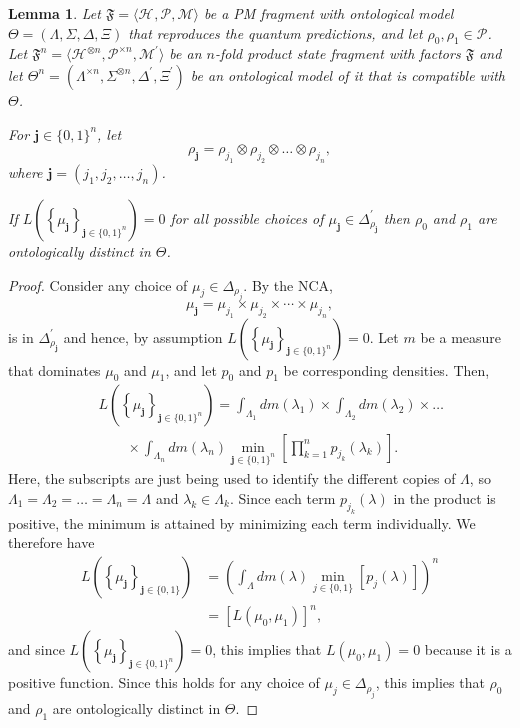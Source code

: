 \documentclass[DIV=calc,fontsize=12pt]{scrartcl} %
\theoremstyle{definition}
\theoremstyle{plain}
\newtheorem{lemma}[definition]{Lemma}
\newcommand{\Hilb}[1][]{\ensuremath{\mathcal{H}_{#1}}}
\begin{document}
\begin{lemma}
\label{lem:Main:prod}
Let $\mathfrak{F} = \langle \Hilb, \mathcal{P}, \mathcal{M} \rangle$
be a PM fragment with ontological model $\Theta = (\Lambda, \Sigma,
\Delta, \Xi)$ that reproduces the quantum predictions, and let
$\rho_0, \rho_1 \in \mathcal{P}$.  Let $\mathfrak{F}^n = \langle
\Hilb^{\otimes n}, \mathcal{P}^{\times n}, \mathcal{M}^{\prime}
\rangle$ be an $n$-fold product state fragment with factors
$\mathfrak{F}$ and let $\Theta^n = (\Lambda^{\times n},
\Sigma^{\otimes n}, \Delta^{\prime}, \Xi^{\prime})$ be an
ontological model of it that is compatible with $\Theta$.

For $\bm{j} \in \{0,1\}^n$, let
\begin{equation}
\rho_{\bm{j}} = \rho_{j_1} \otimes \rho_{j_2} \otimes \ldots
\otimes \rho_{j_n},
\end{equation}
where $\bm{j} = (j_1,j_2,\ldots,j_n)$.

If $L \left ( \left \{ \mu_{\bm{j}}\right \}_{\bm{j} \in \{0,1\}^n}
\right ) = 0$ for all possible choices of $\mu_{\bm{j}} \in
\Delta^{\prime}_{\rho_{\bm{j}}}$ then $\rho_0$ and $\rho_1$ are
ontologically distinct in $\Theta$.
\end{lemma}
\begin{proof}
Consider any choice of $\mu_j \in \Delta_{\rho_j}$.  By the NCA,
\begin{equation}
\mu_{\bm{j}} = \mu_{j_1} \times \mu_{j_2} \times \cdots \times \mu_{j_n},
\end{equation}
is in $\Delta^{\prime}_{\rho_{\bm{j}}}$ and hence, by assumption $L
\left ( \left \{ \mu_{\bm{j}}\right \}_{\bm{j} \in \{0,1\}^n}\right
) = 0$.  Let $m$ be a measure that dominates $\mu_0$ and $\mu_1$,
and let $p_0$ and $p_1$ be corresponding densities. Then,
\begin{eqnarray}
&&L \left ( \left \{ \mu_{\bm{j}}\right \}_{\bm{j} \in \{0,1\}^n}\right ) =
\int_{\Lambda_1} dm(\lambda_1) \times \int_{\Lambda_2} dm(\lambda_2)
\times\ldots\nonumber\\ &&\quad\quad \times \int_{\Lambda_n} dm(\lambda_n)
\min_{\bm{j} \in \{0,1\}^n} \left [ \prod_{k = 1}^n p_{j_k}(\lambda_k)
\right ].
\end{eqnarray}
Here, the subscripts are just being used to identify the different
copies of $\Lambda$, so $\Lambda_1 = \Lambda_2 = \ldots = \Lambda_n
= \Lambda$ and $\lambda_k \in \Lambda_k$.  Since each term
$p_{j_k}(\lambda)$ in the product is positive, the minimum is
attained by minimizing each term individually.  We therefore have
\begin{align}
L \left ( \left \{ \mu_{\bm{j}}\right \}_{\bm{j} \in \{0,1\}} \right ) &
= \left ( \int_{\Lambda}dm(\lambda) \min_{j \in \{0,1\}} \left
[ p_{j}(\lambda) \right ] \right )^n \\
& = \left [ L \left ( \mu_0, \mu_1 \right ) \right ]^n,
\end{align}
and since $L \left ( \left \{ \mu_{\bm{j}}\right \}_{\bm{j} \in
\{0,1\}^n} \right ) = 0$, this implies that $L \left ( \mu_0,
\mu_1\right ) = 0$ because it is a positive function.  Since this
holds for any choice of $\mu_j \in \Delta_{\rho_j}$, this implies
that $\rho_0$ and $\rho_1$ are ontologically distinct in $\Theta$.
\end{proof}
\end{document}
